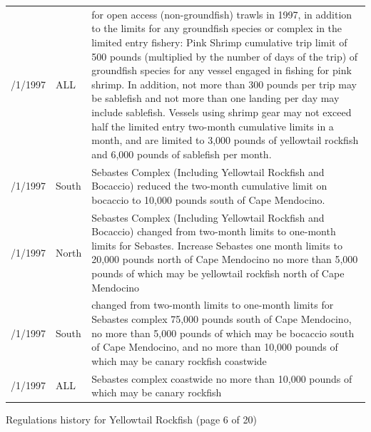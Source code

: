 \documentclass[12pt,]{article}
\begin{document}
\begin{tabular}{>{\centering}p{.60in}>{\centering}p{1.0in}>{\raggedright}p{4.20in}}
  1/1/1997 & ALL & for open access (non-groundfish) trawls in 1997, in addition to the limits for any groundfish species or complex in the limited entry fishery: Pink Shrimp  cumulative trip limit of 500 pounds (multiplied by the number of days of the trip) of groundfish species for any vessel engaged in fishing for pink shrimp.  In addition, not more than 300 pounds per trip may be sablefish and not more than one landing per day may include sablefish.  Vessels using shrimp gear may not exceed half the limited entry two-month cumulative limits in a month, and are limited to 3,000 pounds of yellowtail rockfish and 6,000 pounds of sablefish per month. \\ 
  5/1/1997 & 4030 South & Sebastes Complex (Including Yellowtail Rockfish and Bocaccio)  reduced the two-month cumulative limit on bocaccio to 10,000 pounds south of Cape Mendocino. \\ 
  10/1/1997 & 4030 North & Sebastes Complex (Including Yellowtail Rockfish and Bocaccio)  changed from two-month limits to one-month limits for Sebastes.  Increase Sebastes one month limits to 20,000 pounds north of Cape Mendocino no more than 5,000 pounds of which may be yellowtail rockfish north of Cape Mendocino \\ 
  10/1/1997 & 4030 South & changed from two-month limits to one-month limits for  Sebastes complex 75,000 pounds south of Cape Mendocino, no more than 5,000 pounds of which may be bocaccio south of Cape Mendocino, and no more than 10,000 pounds of which may be canary rockfish coastwide \\ 
  10/1/1997 & ALL & Sebastes complex coastwide no more than 10,000 pounds of which may be canary rockfish \\ 
   \hline
\end{tabular}

\endgroup
\newpage
Regulations history for Yellowtail Rockfish (page 6 of 20)
\begingroup\fontsize{9pt}{10pt}\selectfont
\end{document}
